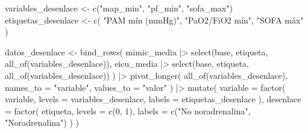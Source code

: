 \documentclass[
  spanish,
  a4paper,
  12pt,
  twoside]{memoir}
\newenvironment{Shaded}{\begin{snugshade}}{\end{snugshade}}
\newcommand{\AttributeTok}[1]{\textcolor[rgb]{0.40,0.45,0.13}{#1}}
\newcommand{\DecValTok}[1]{\textcolor[rgb]{0.68,0.00,0.00}{#1}}
\newcommand{\FunctionTok}[1]{\textcolor[rgb]{0.28,0.35,0.67}{#1}}
\newcommand{\NormalTok}[1]{\textcolor[rgb]{0.00,0.23,0.31}{#1}}
\newcommand{\OtherTok}[1]{\textcolor[rgb]{0.00,0.23,0.31}{#1}}
\newcommand{\SpecialCharTok}[1]{\textcolor[rgb]{0.37,0.37,0.37}{#1}}
\newcommand{\StringTok}[1]{\textcolor[rgb]{0.13,0.47,0.30}{#1}}
\begin{document}
\begin{Shaded}
\begin{Highlighting}[]
\NormalTok{variables\_desenlace }\OtherTok{\textless{}{-}} \FunctionTok{c}\NormalTok{(}\StringTok{"map\_min"}\NormalTok{, }\StringTok{"pf\_min"}\NormalTok{, }\StringTok{"sofa\_max"}\NormalTok{)}
\NormalTok{etiquetas\_desenlace }\OtherTok{\textless{}{-}} \FunctionTok{c}\NormalTok{(}
  \StringTok{"PAM mín (mmHg)"}\NormalTok{, }\StringTok{"PaO2/FiO2 mín"}\NormalTok{, }\StringTok{"SOFA máx"}
\NormalTok{)}

\NormalTok{datos\_desenlace }\OtherTok{\textless{}{-}} \FunctionTok{bind\_rows}\NormalTok{(}
\NormalTok{  mimic\_media }\SpecialCharTok{|\textgreater{}}
    \FunctionTok{select}\NormalTok{(base, etiqueta, }\FunctionTok{all\_of}\NormalTok{(variables\_desenlace)),}
\NormalTok{  eicu\_media }\SpecialCharTok{|\textgreater{}}
    \FunctionTok{select}\NormalTok{(base, etiqueta, }\FunctionTok{all\_of}\NormalTok{(variables\_desenlace))}
\NormalTok{) }\SpecialCharTok{|\textgreater{}}
  \FunctionTok{pivot\_longer}\NormalTok{(}
    \FunctionTok{all\_of}\NormalTok{(variables\_desenlace),}
    \AttributeTok{names\_to =} \StringTok{"variable"}\NormalTok{, }\AttributeTok{values\_to =} \StringTok{"valor"}
\NormalTok{  ) }\SpecialCharTok{|\textgreater{}}
  \FunctionTok{mutate}\NormalTok{(}
    \AttributeTok{variable =} \FunctionTok{factor}\NormalTok{(}
\NormalTok{      variable, }\AttributeTok{levels =}\NormalTok{ variables\_desenlace,}
      \AttributeTok{labels =}\NormalTok{ etiquetas\_desenlace}
\NormalTok{    ),}
    \AttributeTok{desenlace =} \FunctionTok{factor}\NormalTok{(}
\NormalTok{      etiqueta, }\AttributeTok{levels =} \FunctionTok{c}\NormalTok{(}\DecValTok{0}\NormalTok{, }\DecValTok{1}\NormalTok{),}
      \AttributeTok{labels =} \FunctionTok{c}\NormalTok{(}\StringTok{"No noradrenalina"}\NormalTok{, }\StringTok{"Noradrenalina"}\NormalTok{)}
\NormalTok{    )}
\NormalTok{  )}


\end{Highlighting}
\end{Shaded}
\end{document}
